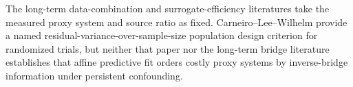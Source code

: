 The long-term data-combination and surrogate-efficiency literatures take the measured proxy system and source ratio as fixed. Carneiro--Lee--Wilhelm provide a named residual-variance-over-sample-size population design criterion for randomized trials, but neither that paper nor the long-term bridge literature establishes that affine predictive fit orders costly proxy systems by inverse-bridge information under persistent confounding.